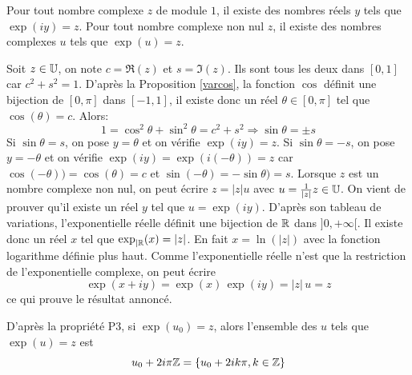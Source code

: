 \begin{propn}\label{surj_exp}
Pour tout nombre complexe $z$ de module $1$, il existe des nombres réels $y$ tels que $\exp(iy) = z$. Pour tout nombre complexe non nul $z$, il existe des nombres complexes $u$ tels que $\exp(u)=z$.
\end{propn}
\begin{demo}
Soit $z\in \mathbb{U}$, on note $c=\Re(z)$ et $s=\Im(z)$. Ils sont tous les deux dans $[0,1]$ car $c^2 + s^2=1$. D'après la Proposition \ref{varcos}, la fonction $\cos$ définit une bijection de $[0,\pi]$ dans $[-1,1]$, il existe donc un réel $\theta\in[0,\pi]$ tel que $\cos(\theta)=c$. Alors:
\begin{displaymath}
  1=\cos^2 \theta + \sin^2 \theta = c^2 + s^2 \Rightarrow \sin \theta = \pm s
\end{displaymath}
Si $\sin \theta = s$, on pose $y=\theta$ et on vérifie $\exp(iy) = z$.\newline
Si $\sin \theta = -s$, on pose $y = -\theta$ et on vérifie $\exp(iy) = \exp(i(-\theta))=z$ car $\cos(-\theta))=\cos(\theta)=c$ et $\sin(-\theta)=-\sin \theta) = s$.\newline
Lorsque $z$ est un nombre complexe non nul, on peut écrire $z=|z|u$ avec $u=\frac{1}{|z|}z\in \mathbb{U}$. On vient de prouver qu'il existe un réel $y$ tel que $u=\exp(iy)$.\newline
D'après son tableau de variations, l'exponentielle réelle définit une bijection de $\mathbb{R}$ dans $]0,+\infty[$. Il existe donc un réel $x$ tel que $\exp_{|\mathbb{R}}(x)=|z|$. En fait $x=\ln(|z|)$ avec la fonction logarithme définie plus haut. Comme l'exponentielle réelle n'est que la restriction de l'exponentielle complexe, on peut écrire
\begin{displaymath}
  \exp(x+iy) = \exp(x)\, \exp(iy) = |z|\, u = z
\end{displaymath}
ce qui prouve le résultat annoncé.
\end{demo}

\begin{rem}
 D'après la propriété P3, si $\exp(u_0)=z$, alors l'ensemble des $u$ tels que $\exp(u)=z$ est
\begin{displaymath}
 u_0 + 2i\pi \mathbb{Z} = \left\lbrace u_0 + 2i k \pi , k\in \mathbb{Z} \right\rbrace 
\end{displaymath}
\end{rem}



